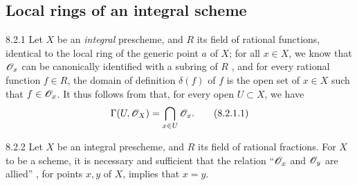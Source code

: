 \documentclass{book}
\begin{document}
\subsection{Local rings of an integral scheme}
\label{1-schemes-8.2}

\begin{env}{8.2.1}
\label{env-1.8.2.1}
Let $X$ be an \emph{integral} prescheme, and $R$ its field of
rational functions, identical to the local ring of the generic point $a$ of $X$;
for all $x\in X$, we know that $\mathscr{O}_x$ can be canonically identified with a
subring of $R$ , and for every rational function $f\in R$, the
domain of definition $\delta(f)$ of $f$ is the open set of $x\in X$ such that
$f\in\mathscr{O}_x$. It thus follows from  that, for every open $U\subset X$,
we have
\[
  \Gamma(U,\mathscr{O}_X)=\bigcap_{x\in U}\mathscr{O}_x.\tag{8.2.1.1}
\]
\end{env}

\begin{envs}[Proposition]{8.2.2}
\label{prop-1.8.2.2}
Let $X$ be an integral prescheme,
and $R$ its field of rational fractions. For $X$ to be a scheme, it is
necessary and sufficient that the relation ``$\mathscr{O}_x$ and $\mathscr{O}_y$ are allied''
, for points $x,y$ of $X$, implies that $x=y$.
\end{envs}
\end{document}
